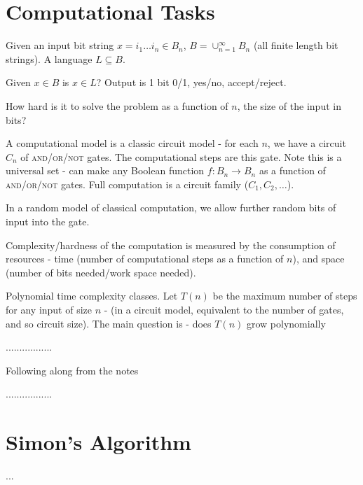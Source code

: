 \section{Computational Tasks}
\label{sec:computational-tasks}

Given an input bit string $x = i_{1} \dots i_{n} \in B_{n}$, $B =
\cup_{n=1}^{\infty} B_{n}$ (all finite length bit strings).  A
language $L \subseteq B$.

\begin{defn}
  \label{defn:fundamentals:1}
  Given $x \in B$ is $x \in L$?  Output is 1 bit 0/1, yes/no, accept/reject.
\end{defn}

\begin{question}
  How hard is it to solve the problem as a function of $n$, the size
  of the input in bits?
\end{question}
A computational model is a classic circuit model - for each $n$, we
have a circuit $C_{n}$ of \textsc{and}/\textsc{or}/\textsc{not} gates.
The computational steps are this gate. Note this is a universal set -
can make any Boolean function $f: B_{n} \rightarrow B_{n}$ as a
function of \textsc{and}/\textsc{or}/\textsc{not} gates.  Full
computation is a circuit family ($C_{1}, C_{2}, \dots$).

In a random model of classical computation, we allow further random
bits of input into the gate.

Complexity/hardness of the computation is measured by the consumption
of resources - time (number of computational steps as a function of
$n$), and space (number of bits needed/work space needed).

Polynomial time complexity classes.  Let $T(n)$ be the maximum number
of steps for any input of size $n$ - (in a circuit model, equivalent
to the number of gates, and so circuit size).  The main question is -
does $T(n)$ grow polynomially 


.................

Following along from the notes

.................


\section{Simon's Algorithm}
\label{sec:simons-algorithm}

...


